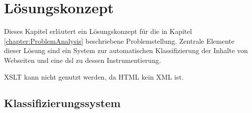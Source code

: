 \chapter{Lösungskonzept}
    \label{chapter:SolutionConcept}
    Dieses Kapitel erläutert ein Lösungskonzept für die in Kapitel \ref{chapter:ProblemAnalysis} beschriebene Problemstellung.
    Zentrale Elemente dieser Lösung sind ein System zur automatischen Klassifizierung der Inhalte von Webseiten
    und eine \gls{dsl} zu dessen Instrumentierung.

    XSLT kann nicht genutzt werden, da HTML kein XML ist.


    \section{Klassifizierungssystem}